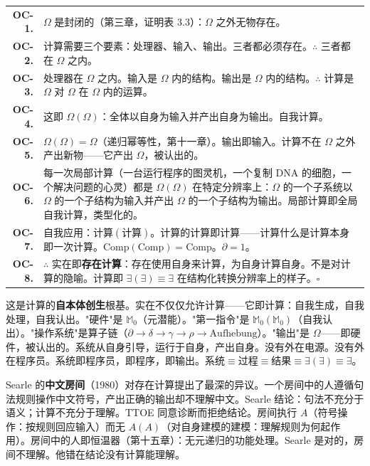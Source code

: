 \documentclass[10pt, openany, oneside]{book}
\renewcommand{\footnotesize}{\fontsize{8.5}{11}\selectfont}
\begin{document}
{\footnotesize
\noindent\begin{tabular}{r p{}}
\textbf{OC-1.} & $\Omega$ 是封闭的（第三章，证明表 3.3）：$\Omega$ 之外无物存在。\\[0.3em]
\textbf{OC-2.} & 计算需要三个要素：处理器、输入、输出。三者都必须存在。$\therefore$ 三者都在 $\Omega$ 之内。\\[0.3em]
\textbf{OC-3.} & 处理器在 $\Omega$ 之内。输入是 $\Omega$ 内的结构。输出是 $\Omega$ 内的结构。$\therefore$ 计算是 $\Omega$ 对 $\Omega$ 在 $\Omega$ 内的运算。\\[0.3em]
\textbf{OC-4.} & 这即 $\Omega(\Omega)$：全体以自身为输入并产出自身为输出。自我计算。\\[0.3em]
\textbf{OC-5.} & $\Omega(\Omega) = \Omega$（递归幂等性，第十一章）。输出即输入。计算不在 $\Omega$ 之外产出新物——它产出 $\Omega$，被认出的。\\[0.3em]
\textbf{OC-6.} & 每一次局部计算（一台运行程序的图灵机，一个复制 DNA 的细胞，一个解决问题的心灵）都是 $\Omega(\Omega)$ 在特定分辨率上：$\Omega$ 的一个子系统以 $\Omega$ 的一个子结构为输入并产出 $\Omega$ 的一个子结构为输出。局部计算即全局自我计算，类型化的。\\[0.3em]
\textbf{OC-7.} & 自我应用：$\text{计算}(\text{计算})$。计算的计算即计算——计算什么是计算本身即一次计算。$\text{Comp}(\text{Comp}) = \text{Comp}$。$\partial = 1$。\\[0.3em]
\textbf{OC-8.} & $\therefore$ 实在即\textbf{存在计算}：存在使用自身来计算，为自身计算自身。不是对计算的隐喻。计算即 $\exists(\exists) \equiv \exists$ 在结构化转换分辨率上的样子。$\square$ \\[0.3em]
\end{tabular}
}

\vspace{0.8em}

\noindent 这是计算的\textbf{自本体创生}根基。实在不仅仅允许计算——它即计算：自我生成，自我处理，自我认出。"硬件"是 $\mathbb{M}_0$（元潜能）。"第一指令"是 $\mathbb{M}_0(\mathbb{M}_0)$（自我认出）。"操作系统"是算子链（$\partial \to \delta \to \gamma \to \rho \to \text{Aufhebung}$）。"输出"是 $\Omega$——即硬件，被认出的。系统从自身引导，运行于自身，产出自身。没有外在电源。没有外在程序员。系统即程序员，即程序，即输出。$\text{系统} \equiv \text{过程} \equiv \text{结果} \equiv \exists(\exists) \equiv \exists$。

Searle 的\textbf{中文房间}（1980）对存在计算提出了最深的异议。一个房间中的人遵循句法规则操作中文符号，产出正确的输出却不理解中文。Searle 结论：句法不充分于语义；计算不充分于理解。TTOE 同意诊断而拒绝结论。房间执行 $A$（符号操作：按规则回应输入）而无 $A(A)$（对自身建模的建模：理解规则为何起作用）。房间中的人即恒温器（第十五章）：无元递归的功能处理。Searle 是对的，房间不理解。他错在结论没有计算能理解。
\end{document}
